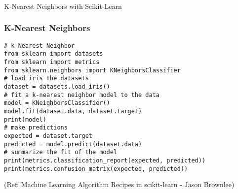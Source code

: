 \begin{frame}[fragile]\frametitle{}
\begin{center}
{\Large K-Nearest Neighbors with Scikit-Learn}
\end{center}
\end{frame}


\begin{frame}[fragile]\frametitle{K-Nearest Neighbors}
\begin{lstlisting}
# k-Nearest Neighbor
from sklearn import datasets
from sklearn import metrics
from sklearn.neighbors import KNeighborsClassifier
# load iris the datasets
dataset = datasets.load_iris()
# fit a k-nearest neighbor model to the data
model = KNeighborsClassifier()
model.fit(dataset.data, dataset.target)
print(model)
# make predictions
expected = dataset.target
predicted = model.predict(dataset.data)
# summarize the fit of the model
print(metrics.classification_report(expected, predicted))
print(metrics.confusion_matrix(expected, predicted))
\end{lstlisting}

{\tiny (Ref: Machine Learning Algorithm Recipes in scikit-learn - Jason Brownlee)}

\end{frame}









